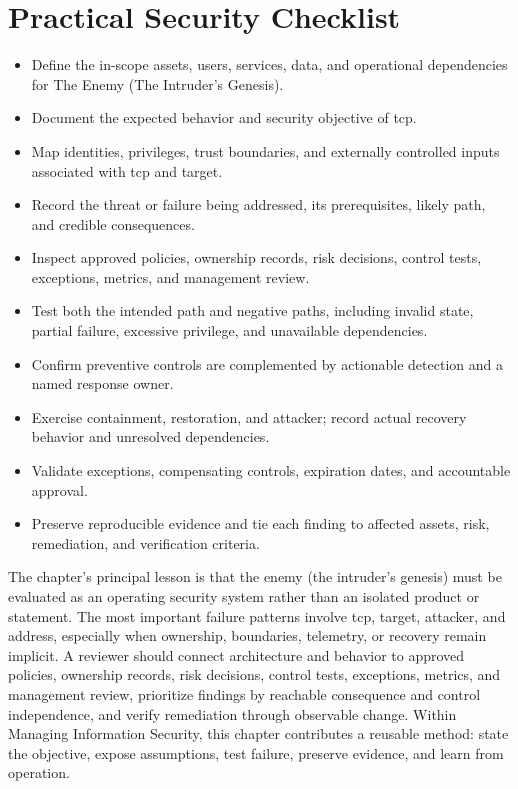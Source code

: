 \documentclass[11pt]{article}
\begin{document}
\section*{Practical Security Checklist}
\begin{itemize}[label=$\square$]
\item Define the in-scope assets, users, services, data, and operational dependencies for The Enemy (The Intruder's Genesis).
\item Document the expected behavior and security objective of tcp.
\item Map identities, privileges, trust boundaries, and externally controlled inputs associated with tcp and target.
\item Record the threat or failure being addressed, its prerequisites, likely path, and credible consequences.
\item Inspect approved policies, ownership records, risk decisions, control tests, exceptions, metrics, and management review.
\item Test both the intended path and negative paths, including invalid state, partial failure, excessive privilege, and unavailable dependencies.
\item Confirm preventive controls are complemented by actionable detection and a named response owner.
\item Exercise containment, restoration, and attacker; record actual recovery behavior and unresolved dependencies.
\item Validate exceptions, compensating controls, expiration dates, and accountable approval.
\item Preserve reproducible evidence and tie each finding to affected assets, risk, remediation, and verification criteria.
\end{itemize}
\begin{synthesisbox}
The chapter's principal lesson is that the enemy (the intruder's genesis) must be evaluated as an operating security system rather than an isolated product or statement. The most important failure patterns involve tcp, target, attacker, and address, especially when ownership, boundaries, telemetry, or recovery remain implicit. A reviewer should connect architecture and behavior to approved policies, ownership records, risk decisions, control tests, exceptions, metrics, and management review, prioritize findings by reachable consequence and control independence, and verify remediation through observable change. Within Managing Information Security, this chapter contributes a reusable method: state the objective, expose assumptions, test failure, preserve evidence, and learn from operation.
\end{synthesisbox}
\end{document}
